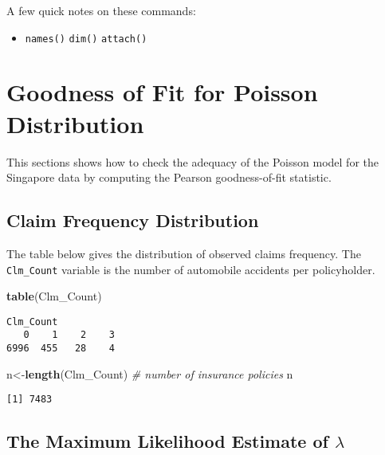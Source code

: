 \documentclass[]{book}
\newenvironment{Shaded}{\begin{snugshade}}{\end{snugshade}}
\newcommand{\KeywordTok}[1]{\textcolor[rgb]{0.13,0.29,0.53}{\textbf{#1}}}
\newcommand{\CommentTok}[1]{\textcolor[rgb]{0.56,0.35,0.01}{\textit{#1}}}
\newcommand{\NormalTok}[1]{#1}
\providecommand{\tightlist}{%
  \setlength{\itemsep}{0pt}\setlength{\parskip}{0pt}}
\theoremstyle{definition}
\theoremstyle{definition}
\theoremstyle{definition}
\theoremstyle{remark}
\begin{document}
A few quick notes on these commands:

\begin{itemize}
\tightlist
\item
  \texttt{names()} \texttt{dim()} \texttt{attach()}
\end{itemize}

\section{Goodness of Fit for Poisson
Distribution}\label{goodness-of-fit-for-poisson-distribution}

This sections shows how to check the adequacy of the Poisson model for
the Singapore data by computing the Pearson goodness-of-fit statistic.

\subsection{Claim Frequency
Distribution}\label{claim-frequency-distribution-2}

The table below gives the distribution of observed claims frequency. The
\texttt{Clm\_Count} variable is the number of automobile accidents per
policyholder.

\begin{Shaded}
\begin{Highlighting}[]
\KeywordTok{table}\NormalTok{(Clm_Count) }
\end{Highlighting}
\end{Shaded}

\begin{verbatim}
Clm_Count
   0    1    2    3 
6996  455   28    4 
\end{verbatim}

\begin{Shaded}
\begin{Highlighting}[]
\NormalTok{n<-}\KeywordTok{length}\NormalTok{(Clm_Count)  }\CommentTok{# number of insurance policies }
\NormalTok{n}
\end{Highlighting}
\end{Shaded}

\begin{verbatim}
[1] 7483
\end{verbatim}

\subsection{\texorpdfstring{The Maximum Likelihood Estimate of
\(\lambda\)}{The Maximum Likelihood Estimate of \textbackslash{}lambda}}\label{the-maximum-likelihood-estimate-of-lambda}
\end{document}
